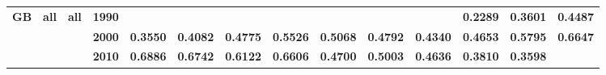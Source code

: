 \documentclass[
  authoryear,
  preprint,
  3p]{elsarticle}
\begin{document}
\begin{landscape}
\begin{longtable}[t]{>{}l>{}l>{}l>{}l>{}r>{}r>{}r>{}r>{}r>{}r>{}r>{}r>{}r>{}r}
\addlinespace
\textbf{GB} & \textbf{all} & \textbf{all} & \textbf{1990} & \textcolor[HTML]{4285f4}{\textbf{}} & \textcolor[HTML]{4285f4}{\textbf{}} & \textcolor[HTML]{4285f4}{\textbf{}} & \textcolor[HTML]{4285f4}{\textbf{}} & \textcolor[HTML]{4285f4}{\textbf{}} & \textcolor[HTML]{4285f4}{\textbf{}} & \textcolor[HTML]{4285f4}{\textbf{}} & \textcolor[HTML]{4285f4}{\textbf{0.2289}} & \textcolor[HTML]{4285f4}{\textbf{0.3601}} & \textcolor[HTML]{4285f4}{\textbf{0.4487}}\\
\textbf{} & \textbf{} & \textbf{} & \textbf{2000} & \textcolor[HTML]{4285f4}{\textbf{0.3550}} & \textcolor[HTML]{4285f4}{\textbf{0.4082}} & \textcolor[HTML]{4285f4}{\textbf{0.4775}} & \textcolor[HTML]{4285f4}{\textbf{0.5526}} & \textcolor[HTML]{4285f4}{\textbf{0.5068}} & \textcolor[HTML]{4285f4}{\textbf{0.4792}} & \textcolor[HTML]{4285f4}{\textbf{0.4340}} & \textcolor[HTML]{4285f4}{\textbf{0.4653}} & \textcolor[HTML]{4285f4}{\textbf{0.5795}} & \textcolor[HTML]{4285f4}{\textbf{0.6647}}\\
\textbf{} & \textbf{} & \textbf{} & \textbf{2010} & \textcolor[HTML]{4285f4}{\textbf{0.6886}} & \textcolor[HTML]{4285f4}{\textbf{0.6742}} & \textcolor[HTML]{4285f4}{\textbf{0.6122}} & \textcolor[HTML]{4285f4}{\textbf{0.6606}} & \textcolor[HTML]{4285f4}{\textbf{0.4700}} & \textcolor[HTML]{4285f4}{\textbf{0.5003}} & \textcolor[HTML]{4285f4}{\textbf{0.4636}} & \textcolor[HTML]{4285f4}{\textbf{0.3810}} & \textcolor[HTML]{4285f4}{\textbf{0.3598}} & \textcolor[HTML]{4285f4}{\textbf{}}\\
\bottomrule

\end{longtable}

\endgroup{}
\end{landscape}

\newpage

\begingroup\fontsize{7}{9}\selectfont
\end{document}
